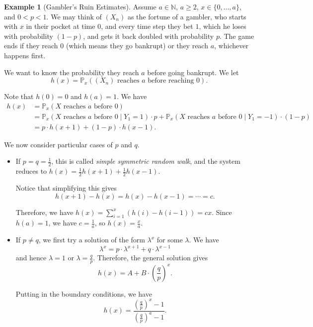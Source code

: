 \documentclass[11pt]{article}
\numberwithin{equation}{section}
\theoremstyle{definition}
\newtheorem{example}[theorem]{Example}
\theoremstyle{remark}
\newcommand{\pqty}[1]{\left(#1\right)}
\newcommand{\NN}{\mathbb N}
\newcommand{\Prob}{\mathbb P}
\newcommand{\Conditional}[2]{#1\mid #2}
\begin{document}
\begin{example}[Gambler's Ruin Estimates]\label{probability-example-029}
    \label{probability-ex:gambler-ruin-estimates}%
Assume \(a\in\NN\), \(a\ge2\), \(x\in\{0,\ldots,a\}\), and \(0<p<1\).
    We may think of \(\pqty{X_n}\) as the fortune of a gambler, who starts with \(x\) in their pocket at time \(0\), and every time step they bet \(1\), which he loses with probability \(\pqty{1 - p}\), and gets it back doubled with probability \(p\). The game ends if they reach \(0\) (which means they go bankrupt) or they reach \(a\), whichever happens first.

    We want to know the probability they reach \(a\) before going bankrupt. We let
    \[
        h\pqty{x} = \Prob_x \pqty{\pqty{X_n} \text{ reaches }a\text{ before reaching }0}.
    \]

    Note that \(h\pqty{0} = 0\) and \(h\pqty{a} = 1\). We have
    \begin{align*}
        h\pqty{x} &= \Prob_x \pqty{X \text{ reaches }a\text{ before }0} \\
        &= \Prob_x \pqty{\Conditional{X \text{ reaches }a\text{ before }0}{Y_1 = 1}} \cdot p + \Prob_x \pqty{\Conditional{X \text{ reaches }a\text{ before }0}{Y_1 = -1}} \cdot \pqty{1 - p} \\
        &= p \cdot h \pqty{x + 1} + \pqty{1 - p} \cdot h \pqty{x - 1}.
    \end{align*}

    We now consider particular cases of \(p\) and \(q\).

    \begin{itemize}
        \item If \(p = q = \frac{1}{2}\), this is called \emph{simple symmetric random walk}, and the system reduces to \(h\pqty{x} = \frac{1}{2} h \pqty{x + 1} + \frac{1}{2} h \pqty{x - 1}\).
        
        Notice that simplifying this gives
        \[
            h\pqty{x + 1} - h\pqty{x} = h\pqty{x} - h\pqty{x - 1} = \cdots = c.
        \]

        Therefore, we have \(h\pqty{x} = \sum_{i = 1}^{x} \pqty{h\pqty{i} - h\pqty{i - 1}} = cx\). Since \(h\pqty{a} = 1\), we have \(c = \frac{1}{a}\), so \(h\pqty{x} = \frac{x}{a}\).

        \item If \(p \neq q\), we first try a solution of the form \(\lambda^x\) for some \(\lambda\). We have
        \[
            \lambda^x = p \cdot \lambda^{x + 1} + q \cdot \lambda^{x - 1}
        \]
        and hence \(\lambda = 1\) or \(\lambda = \frac{q}{p}\). Therefore, the general solution gives
        \[
            h\pqty{x} = A + B \cdot \pqty{\frac{q}{p}}^x.
        \]

        Putting in the boundary conditions, we have
        \[
            h\pqty{x} = \frac{\pqty{\frac{q}{p}}^x - 1}{\pqty{\frac{q}{p}}^a - 1}.
        \]
    \end{itemize}
\end{example}
\end{document}
